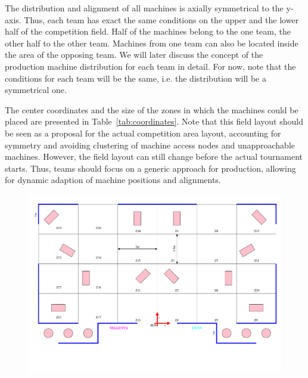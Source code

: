 \documentclass[12pt,twoside]{article}
\begin{document}
The distribution and alignment of all machines is axially symmetrical
to the y-axis. Thus, each team has exact the same conditions on the
upper and the lower half of the competition field. Half of the 
machines belong to the one team, the other
half to the other team. Machines from one team can also be located inside
the area of the opposing team. We will later discuss the concept of
the production machine distribution for each team in detail. For now,
note that the conditions for each team will be the same, i.e. the
distribution will be a symmetrical one.

The center coordinates and the size of the zones in which the machines could
be placed are presented in Table~\ref{tab:coordinates}. Note
that this field layout should be seen as a proposal for the actual
competition area layout, accounting for symmetry and avoiding
clustering of machine access nodes and unapproachable
machines. However, the field layout can still change before the actual
tournament starts. Thus, teams should focus on a generic approach for
production, allowing for dynamic adaption of machine positions and
alignments.

\begin{figure}
  \label{fig:competition-area}
  \includegraphics[angle=-90, trim = 0 60 30 0, scale=0.85]{field.pdf}
\end{figure}
\end{document}
